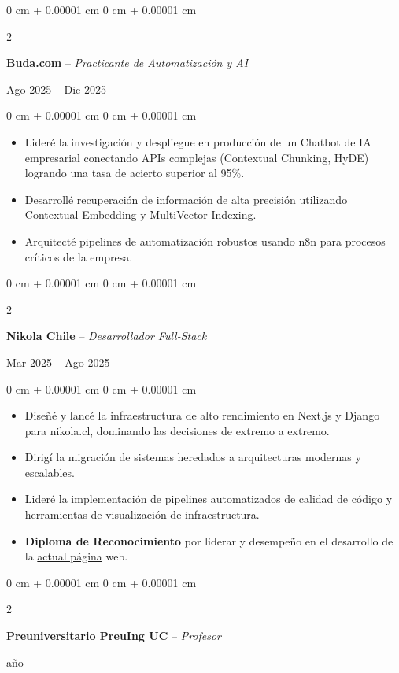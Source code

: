 \documentclass[10pt, letterpaper]{article}
\newenvironment{highlights}{
    \begin{itemize}[
        topsep=0.10 cm,
        parsep=0.10 cm,
        partopsep=0pt,
        itemsep=0pt,
        leftmargin=0 cm + 10pt
    ]
}{
    \end{itemize}
} %
\newenvironment{onecolentry}{
    \begin{adjustwidth}{
        0 cm + 0.00001 cm
    }{
        0 cm + 0.00001 cm
    }
}{
    \end{adjustwidth}
} %
\newenvironment{twocolentry}[2][]{
    \onecolentry
    \def\secondColumn{#2}
    \setcolumnwidth{\fill, 4.5 cm}
    \begin{paracol}{2}
}{
    \switchcolumn \raggedleft \secondColumn
    \end{paracol}
    \endonecolentry
} %
\begin{document}
    \begin{twocolentry}{Ago 2025 – Dic 2025}
        \textbf{Buda.com} -- \textit{Practicante de Automatización y AI}
    \end{twocolentry}
    \vspace{0.10 cm}
    \begin{onecolentry}
        \begin{highlights}
            \item Lideré la investigación y despliegue en producción de un Chatbot de IA empresarial conectando APIs complejas (Contextual Chunking, HyDE) logrando una tasa de acierto superior al 95\%.
            \item Desarrollé recuperación de información de alta precisión utilizando Contextual Embedding y MultiVector Indexing.
            \item Arquitecté pipelines de automatización robustos usando n8n para procesos críticos de la empresa.
        \end{highlights}
    \end{onecolentry}
    \vspace{0.2 cm}

    \begin{twocolentry}{Mar 2025 – Ago 2025}
        \textbf{Nikola Chile} -- \textit{Desarrollador Full-Stack}
    \end{twocolentry}
    \vspace{0.10 cm}
    \begin{onecolentry}
        \begin{highlights}
            \item Diseñé y lancé la infraestructura de alto rendimiento en Next.js y Django para nikola.cl, dominando las decisiones de extremo a extremo.
            \item Dirigí la migración de sistemas heredados a arquitecturas modernas y escalables.
            \item Lideré la implementación de pipelines automatizados de calidad de código y herramientas de visualización de infraestructura.
            \item \textbf{Diploma de Reconocimiento} por liderar y desempeño en el desarrollo de la \href{www.nikola.cl}{actual página} web. 
        \end{highlights}
    \end{onecolentry}
    \vspace{0.2 cm}

    \begin{twocolentry}{1 año}
        \textbf{Preuniversitario PreuIng UC} -- \textit{Profesor}
    \end{twocolentry}
    \vspace{0.2 cm}
\end{document}
